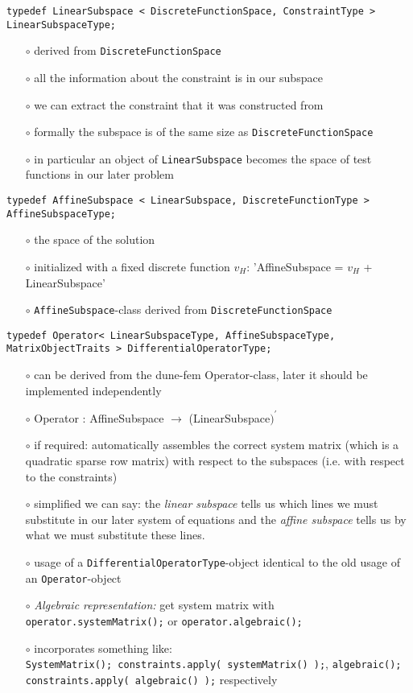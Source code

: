 \documentclass[a4paper,11pt]{article}
\numberwithin{equation}{section}
\newcommand{\CodeT}[1]{\textnormal{\texttt{#1}}}
\begin{document}
\noindent\CodeT{typedef LinearSubspace < DiscreteFunctionSpace, ConstraintType >}
\CodeT{LinearSubspaceType;}
\begin{itemize}
	\item[$\circ$] derived from \CodeT{DiscreteFunctionSpace}
	\item[$\circ$] all the information about the constraint is in our subspace
	\item[$\circ$] we can extract the constraint that it was constructed from
	\item[$\circ$] formally the subspace is of the same size as \CodeT{DiscreteFunctionSpace}
	\item[$\circ$] in particular an object of \CodeT{LinearSubspace} becomes the space of test functions in our later problem
\end{itemize}
\noindent\CodeT{typedef AffineSubspace < LinearSubspace, DiscreteFunctionType >} \CodeT{AffineSubspaceType;}
\begin{itemize}
	\item[$\circ$] the space of the solution
	\item[$\circ$] initialized with a fixed discrete function $v_H$: 'AffineSubspace = $v_H$ + LinearSubspace'
	\item[$\circ$] \CodeT{AffineSubspace}-class derived from \CodeT{DiscreteFunctionSpace}
\end{itemize}
\noindent\CodeT{typedef Operator< LinearSubspaceType, AffineSubspaceType,}
\CodeT{MatrixObjectTraits > DifferentialOperatorType;}
\begin{itemize}
	\item[$\circ$] can be derived from the dune-fem Operator-class, later it should be implemented independently
	\item[$\circ$] Operator : AffineSubspace $\rightarrow$ (LinearSubspace$)^{\prime}$
	\item[$\circ$] if required: automatically assembles the correct system matrix (which is a quadratic sparse row matrix) with respect to the subspaces (i.e. with respect to the constraints)
	\item[$\circ$] simplified we can say: the {\it linear subspace} tells us which lines we must substitute in our later system of equations and the {\it affine subspace} tells us by what we must substitute these lines.
	\item[$\circ$] usage of a \CodeT{DifferentialOperatorType}-object identical to the old usage of an \CodeT{Operator}-object
	\item[$\circ$] {\it Algebraic representation:} get system matrix with \CodeT{operator.systemMatrix();} or \CodeT{operator.algebraic();}
	\item[$\circ$] incorporates something like:\\
	\CodeT{SystemMatrix(); constraints.apply( systemMatrix() );}, \CodeT{algebraic(); constraints.apply( algebraic() );} respectively
\end{itemize}
\end{document}
